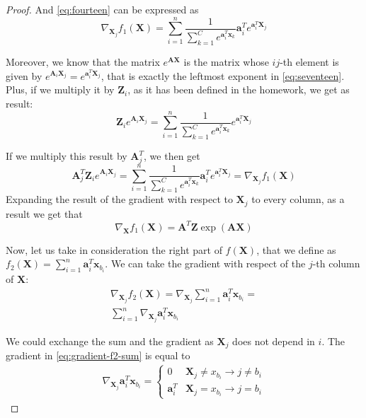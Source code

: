 \documentclass[12pt]{article}
\newcommand{\expaxsum}{\sum_{k=1}^{C} e^{\mathbf{a}_{i}^T\mathbf{x}_k}}
\newcommand{\boldX}{\mathbf{X}}
\begin{document}
\begin{proof}
And \eqref{eq:fourteen} can be expressed as
\begin{equation} \label{eq:seventeen}
    \nabla_{\boldX_j} f_1(\boldX) = \sum_{i=1}^n \frac{1}{\expaxsum} \mathbf{a}_i^T e^{\mathbf{a}_i^T \mathbf{X}_j}
\end{equation}

Moreover, we know that the matrix $e^{\mathbf{A}\mathbf{X}}$ is the matrix whose $ij$-th element is given by $e^{\mathbf{A}_i\mathbf{X}_j} = e^{\mathbf{a}_i^T \mathbf{X}_j}$, that is exactly the leftmost exponent in \eqref{eq:seventeen}. Plus, if we multiply it by $\mathbf{Z}_i$, as it has been defined in the homework, we get as result:
\begin{equation}
    \mathbf{Z}_ie^{\mathbf{A}_i\mathbf{X}_j} = \sum_{i=1}^n \frac{1}{\expaxsum} e^{\mathbf{a}_i^T \mathbf{X}_j}
\end{equation}

If we multiply this result by $\mathbf{A}_j^T$, we then get
\begin{equation}
    \mathbf{A}_j^T \mathbf{Z}_ie^{\mathbf{A}_i\mathbf{X}_j} = \sum_{i=1}^n \frac{1}{\expaxsum} \mathbf{a}_i^T e^{\mathbf{a}_i^T \mathbf{X}_j} = \nabla_{\boldX_j} f_1(\boldX)
\end{equation}
Expanding the result of the gradient with respect to $\boldX_j$ to every column, as a result we get that
\begin{equation} \label{eq:f1-gradient}
     \nabla_{\boldX} f_1(\boldX) = \mathbf{A}^T \mathbf{Z} \exp{(\mathbf{A}\mathbf{X})}
\end{equation}

Now, let us take in consideration the right part of $f(\boldX)$, that we define as $f_2(\boldX) = \sum_{i=1}^{n} \mathbf{a}_i^T \mathbf{x}_{b_i}$. We can take the gradient with respect of the $j$-th column of $\boldX$:
\begin{gather}
    \nabla_{\boldX_j} f_2(\boldX) = \nabla_{\boldX_j}\sum_{i=1}^{n} \mathbf{a}_i^T \mathbf{x}_{b_i} = \\
    \sum_{i=1}^{n} \nabla_{\boldX_j} \mathbf{a}_i^T \mathbf{x}_{b_i} \label{eq:gradient-f2-sum}
\end{gather}

We could exchange the sum and the gradient as $\boldX_j$ does not depend in $i$. The gradient in \eqref{eq:gradient-f2-sum} is equal to
\begin{gather}
    \nabla_{\boldX_j} \mathbf{a}_i^T \mathbf{x}_{b_i} = \begin{cases}
    0 & \boldX_j \neq x_{b_i} \rightarrow j \neq b_i \\
    \mathbf{a}_i^T & \boldX_j = x_{b_i} \rightarrow j = b_i
    \end{cases}
\end{gather}


\end{proof}
\end{document}
